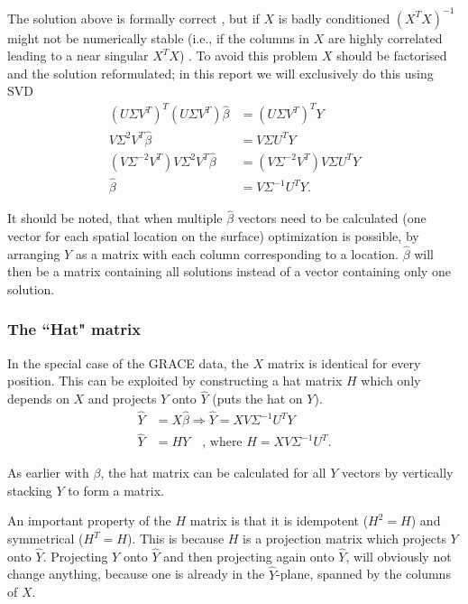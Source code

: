 The solution above is formally correct \cite[p.~12]{statistical-learning}, but if $X$ is badly conditioned $(X^T X)^{-1}$ might not be numerically stable (i.e., if the columns in $X$ are highly correlated leading to a near singular $X^T X$) \cite[p.~8]{aasbjerg-ls}.
To avoid this problem $X$ should be factorised and the solution reformulated; in this report we will exclusively do this using SVD
\begin{equation}
\begin{split}
\left( U \Sigma V^T\right)^T \left(U \Sigma V^T\right) \hat{\beta} &= \left(U \Sigma V^T\right)^T Y \\
V \Sigma^2 V^T \hat{\beta} &= V \Sigma U^T Y \\
\left(V \Sigma^{-2} V^T\right) V \Sigma^2 V^T \hat{\beta} &= \left(V \Sigma^{-2} V^T\right) V \Sigma U^T Y \\
\hat{\beta} &= V \Sigma^{-1} U^T Y.
\end{split}
\end{equation}

It should be noted, that when multiple $\hat{\beta}$ vectors need to be calculated (one vector for each spatial location on the surface) optimization is possible, by arranging $Y$ as a matrix with each column corresponding to a location.
$\hat{\beta}$ will then be a matrix containing all solutions instead of a vector containing only one solution.

\subsubsection{The ``Hat" matrix}
In the special case of the GRACE data, the $X$ matrix is identical for every position. This can be exploited by constructing a hat matrix $H$ which only depends on $X$ and projects $Y$ onto $\hat{Y}$ (puts the hat on $Y$).
\begin{equation}
\begin{split}
\hat{Y} &= X \hat{\beta} \Rightarrow \hat{Y} = X V \Sigma^{-1} U^T Y \\
\hat{Y} &= H Y \quad \text{, where } H = X V \Sigma^{-1} U^T.
\end{split}
\end{equation}

As earlier with $\beta$, the hat matrix can be calculated for all $Y$ vectors by vertically stacking $Y$ to form a matrix.

An important property of the $H$ matrix is that it is idempotent ($H^2 = H$) and symmetrical ($H^T = H$).
This is because $H$ is a projection matrix which projects $Y$ onto $\hat{Y}$.
Projecting $Y$ onto $\hat{Y}$ and then projecting again onto $\hat{Y}$, will obviously not change anything, because one is already in the $\hat{Y}$-plane, spanned by the columns of $X$.

